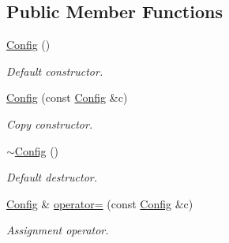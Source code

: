 \subsection*{Public Member Functions}
\begin{DoxyCompactItemize}
\item 
\hyperlink{class_d_d4hep_1_1_display_configuration_1_1_config_ae8da46c00b3e85bc7c2a247175216bbc}{Config} ()
\begin{DoxyCompactList}\small\item\em Default constructor. \item\end{DoxyCompactList}\item 
\hyperlink{class_d_d4hep_1_1_display_configuration_1_1_config_ab5d7a0d2cf59ed2ca47afabd66fd2918}{Config} (const \hyperlink{class_d_d4hep_1_1_display_configuration_1_1_config}{Config} \&c)
\begin{DoxyCompactList}\small\item\em Copy constructor. \item\end{DoxyCompactList}\item 
\hyperlink{class_d_d4hep_1_1_display_configuration_1_1_config_a3ae52820778d8b7cdf70518bc1504c8f}{$\sim$Config} ()
\begin{DoxyCompactList}\small\item\em Default destructor. \item\end{DoxyCompactList}\item 
\hyperlink{class_d_d4hep_1_1_display_configuration_1_1_config}{Config} \& \hyperlink{class_d_d4hep_1_1_display_configuration_1_1_config_a4fd5de82887e43ea1a99204c73e13c47}{operator=} (const \hyperlink{class_d_d4hep_1_1_display_configuration_1_1_config}{Config} \&c)
\begin{DoxyCompactList}\small\item\em Assignment operator. \item\end{DoxyCompactList}\end{DoxyCompactItemize}
